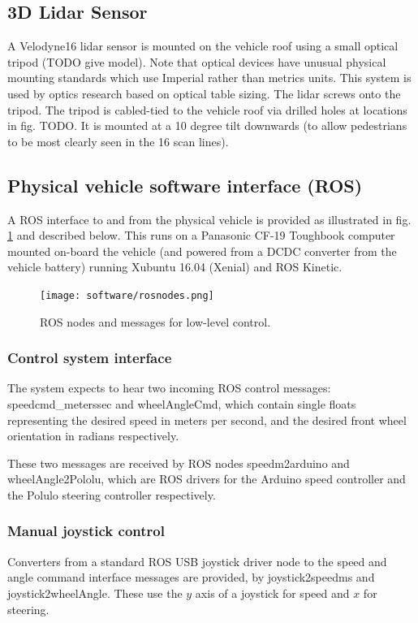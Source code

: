 \documentclass[a4paper]{article}
\begin{document}
\subsection{3D Lidar Sensor}
A Velodyne16 lidar sensor is mounted on the vehicle roof using a small optical tripod (TODO give model). Note that optical devices have unusual physical mounting standards which use Imperial rather than metrics units.  This system is used by optics research based on optical table sizing.   The lidar screws onto the tripod. The tripod is cabled-tied to the vehicle roof via  drilled holes at locations in fig. TODO.  It is mounted at a 10 degree tilt downwards (to allow pedestrians to be most clearly seen in the 16 scan lines).

\subsection{Physical vehicle software interface (ROS)}

A ROS interface to and from the physical vehicle is provided as illustrated in fig. \ref{fig:meshSim} and described below. This runs on a Panasonic CF-19 Toughbook computer mounted on-board the vehicle (and powered from a DCDC converter from the  vehicle battery) running Xubuntu 16.04 (Xenial) and ROS Kinetic.

\begin{figure}[h]
	\texttt{[image: software/rosnodes.png]}
	\caption{ROS nodes and messages for low-level control.}
	\label{fig:meshSim}
\end{figure}

\subsubsection{Control system interface}
The system expects to hear two incoming ROS control messages:     speedcmd\_meterssec and wheelAngleCmd, which contain single floats representing the desired speed in meters per second, and the desired front wheel orientation in radians respectively.

These two messages are received by ROS nodes speedm2arduino and wheelAngle2Pololu, which are ROS drivers for the Arduino speed controller and the Polulo steering controller respectively.

\subsubsection{Manual joystick control}
Converters from a standard ROS USB joystick driver node to the speed and angle command interface messages are provided, by joystick2speedms and joystick2wheelAngle.  These use the $y$ axis of a joystick for speed and $x$ for steering.
\end{document}
